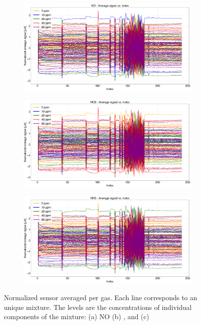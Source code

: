 \begin{figure}[!htb]
	\centering
	
	\begin{subfigure}[t]{0.9\textwidth}
		\includegraphics[width=1\linewidth]{../figures/order2NO.png}
		\caption{}
		\label{fig:order2NO} 
	\end{subfigure}
	
	\begin{subfigure}[t]{0.9\textwidth}
		\includegraphics[width=1\linewidth]{../figures/order2NO2.png}
		\caption{}
		\label{fig:order2NO2}
	\end{subfigure}

	\begin{subfigure}[t]{0.9\textwidth}
		\includegraphics[width=1\linewidth]{../figures/order2NH3.png}
		\caption{}
		\label{fig:order2NH3}
	\end{subfigure}
	
	\caption{Normalized sensor averaged per gas. Each line corresponds to an unique mixture. The levels are the concentrations of individual components of the mixture: (a) NO (b) , and (c) }
	\label{fig:order2-both}
\end{figure}




